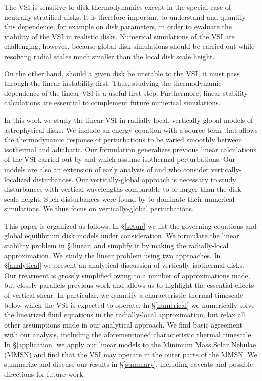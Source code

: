 \documentclass[iop]{emulateapj}
\begin{document}

The VSI is sensitive to disk thermodynamics except
in the special case of neutrally stratified disks. It is therefore
important to understand and quantify this dependence, for example on
disk parameters, in order to evaluate the viability of the VSI in
realistic disks. Numerical simulations of the VSI are challenging,
however, because global disk simulations should be carried out while
resolving radial scales much smaller than the local disk scale height.   

On the other hand, should a given disk be
unstable to the VSI, it must pass through the linear instability
first. Thus, studying the thermodynamic dependence of the linear VSI
is a useful first step. Furthermore, linear stability calculations are
essential to complement future numerical simulations.  

In this work we study the linear VSI in radially-local,
vertically-global models of astrophysical disks. We include an energy
equation with a source term that allows the thermodynamic response of
perturbations to be varied smoothly between isothermal and adiabatic. Our
formulation generalizes previous linear calculations of the 
VSI carried out by \cite{nelson13} and \cite{mcnally14} which assume
isothermal perturbations. Our models are also an extension of early
analysis of \cite{urpin98} and \cite{urpin03} who consider
vertically-localized disturbances. Our vertically-global approach is
necessary to study disturbances with vertical wavelengths
comparable to or larger than the disk scale height. Such disturbances were 
found by \cite{nelson13} to dominate their numerical simulations. 
We thus focus on vertically-global perturbations. 



This paper is organized as follows. In \S\ref{setup} we list the
governing equations and global equilibrium disk models under
consideration. We formulate the linear stability problem in
\S\ref{linear} and simplify it by making the radially-local
approximation. We study the linear problem using two approaches. In
\S\ref{analytical} we present an analytical discussion of vertically
isothermal disks. Our treatment is grossly simplified owing to a
number of approximations made, but closely parallels previous work and 
allows us to highlight the essential effects of vertical shear. In
particular, we quantify a characteristic thermal timescale below which
the VSI is expected to operate. In \S\ref{numerical} we numerically
solve the linearized fluid equations in the radially-local
approximation, but relax all other assumptions made in our analytical approach.   
We find basic agreement with our analysis, including
the aforementioned characteristic thermal timescale. In
\S\ref{application} we apply our linear models to the Minimum Mass
Solar Nebulae (MMSN) and find that the VSI may operate in the outer
parts of the MMSN. We summarize and discuss our results in
\S\ref{summary}, including caveats and possible directions for future
work.  







 


\appendix




\end{document}
